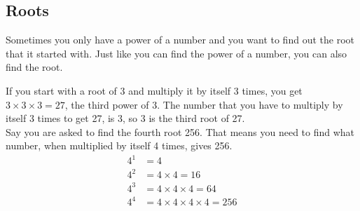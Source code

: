 \documentclass{article}
\begin{document}
\begin{spacing}{1.25}
\vspace{28pt}

\vspace{28pt}

\pagebreak

\section{Roots}

Sometimes you only have a power of a number and you want to find out the root that it started with. Just like you can find the power of a number, you can also find the root.

If you start with a root of 3 and multiply it by itself 3 times, you get $3 \times 3 \times 3 = 27$, the third power of 3. The number that you have to multiply by itself 3 times to get 27, is 3, so 3 is the third root of 27.\\

Say you are asked to find the fourth root 256. That means you need to find what number, when multiplied by itself 4 times, gives  256.
\begin{align*}
4^1 &= 4\\
4^2 &= 4 \times 4 = 16\\
4^3 &= 4 \times 4 \times 4 = 64\\
4^4 &= 4 \times 4 \times 4 \times 4 = 256
\end{align*}


\end{spacing}
\end{document}
